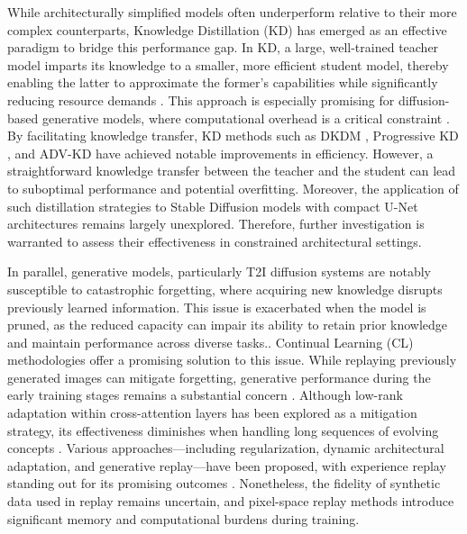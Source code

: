 \documentclass[a4paper,fleqn]{ieeetj}
\begin{document}
While architecturally simplified models often underperform relative to their more complex counterparts, Knowledge Distillation (KD) has emerged as an effective paradigm to bridge this performance gap. In KD, a large, well-trained teacher model imparts its knowledge to a smaller, more efficient student model, thereby enabling the latter to approximate the former’s capabilities while significantly reducing resource demands \cite{nguyen2024swiftbrush}. This approach is especially promising for diffusion-based generative models, where computational overhead is a critical constraint \cite{huang2023knowledge}. By facilitating knowledge transfer, KD methods such as DKDM \cite{xiang2024dkdm}, Progressive KD \cite{gupta2024progressive}, and ADV-KD \cite{mekonnen2024adv} have achieved notable improvements in efficiency. However, a straightforward knowledge transfer between the teacher and the student can lead to suboptimal performance and potential overfitting. Moreover, the application of such distillation strategies to Stable Diffusion models with compact U-Net architectures remains largely unexplored. Therefore, further investigation is warranted to assess their effectiveness in constrained architectural settings.

In parallel, generative models, particularly T2I diffusion systems are notably susceptible to catastrophic forgetting, where acquiring new knowledge disrupts previously learned information. This issue is exacerbated when the model is pruned, as the reduced capacity can impair its ability to retain prior knowledge and maintain performance across diverse tasks.\cite{liang2025diffusion}. Continual Learning (CL) methodologies offer a promising solution to this issue. While replaying previously generated images can mitigate forgetting, generative performance during the early training stages remains a substantial concern \cite{jodelet2023class}. Although low-rank adaptation within cross-attention layers has been explored as a mitigation strategy, its effectiveness diminishes when handling long sequences of evolving concepts \cite{smith2023continual}. Various approaches—including regularization, dynamic architectural adaptation, and generative replay—have been proposed, with experience replay standing out for its promising outcomes \cite{liang2025diffusion}. Nonetheless, the fidelity of synthetic data used in replay remains uncertain, and pixel-space replay methods introduce significant memory and computational burdens during training.
\end{document}
